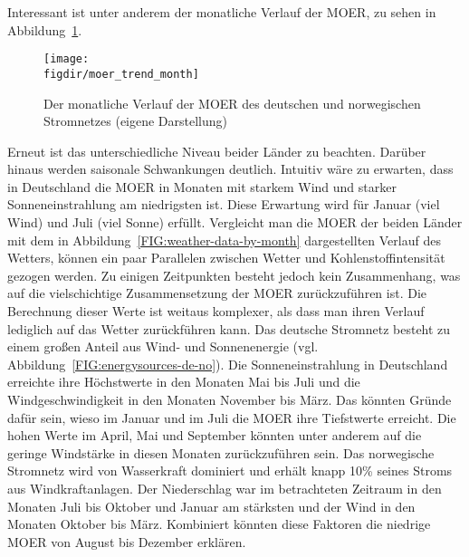 Interessant ist unter anderem der monatliche Verlauf der \ac{MOER}, zu sehen in Abbildung~\ref{FIG:moer_trend_month}.
\begin{figure}
 \caption[Monatlicher Verlauf der MOER von Deutschland und Norwegen]{Der monatliche Verlauf der MOER des deutschen und norwegischen Stromnetzes (eigene Darstellung)}
 {\texttt{[image: \\figdir/moer\_trend\_month]}}
 \label{FIG:moer_trend_month}
\end{figure}
Erneut ist das unterschiedliche Niveau beider Länder zu beachten.
Darüber hinaus werden saisonale Schwankungen deutlich.
Intuitiv wäre zu erwarten, dass in Deutschland die \ac{MOER} in Monaten mit starkem Wind und starker Sonneneinstrahlung am niedrigsten ist.
Diese Erwartung wird für Januar (viel Wind) und Juli (viel Sonne) erfüllt.
Vergleicht man die \ac{MOER} der beiden Länder mit dem in Abbildung~\ref{FIG:weather-data-by-month} dargestellten Verlauf des Wetters, können ein paar Parallelen zwischen Wetter und Kohlenstoffintensität gezogen werden.
Zu einigen Zeitpunkten besteht jedoch kein Zusammenhang, was auf die vielschichtige Zusammensetzung der \ac{MOER} zurückzuführen ist.
Die Berechnung dieser Werte ist weitaus komplexer, als dass man ihren Verlauf lediglich auf das Wetter zurückführen kann.
Das deutsche Stromnetz besteht zu einem großen Anteil aus Wind- und Sonnenenergie (vgl. Abbildung~\ref{FIG:energysources-de-no}).
Die Sonneneinstrahlung in Deutschland erreichte ihre Höchstwerte in den Monaten Mai bis Juli und die Windgeschwindigkeit in den Monaten November bis März.
Das könnten Gründe dafür sein, wieso im Januar und im Juli die \ac{MOER} ihre Tiefstwerte erreicht.
Die hohen Werte im April, Mai und September könnten unter anderem auf die geringe Windstärke in diesen Monaten zurückzuführen sein.
Das norwegische Stromnetz wird von Wasserkraft dominiert und erhält knapp 10\% seines Stroms aus Windkraftanlagen.
Der Niederschlag war im betrachteten Zeitraum in den Monaten Juli bis Oktober und Januar am stärksten und der Wind in den Monaten Oktober bis März.
Kombiniert könnten diese Faktoren die niedrige \ac{MOER} von August bis Dezember erklären.

